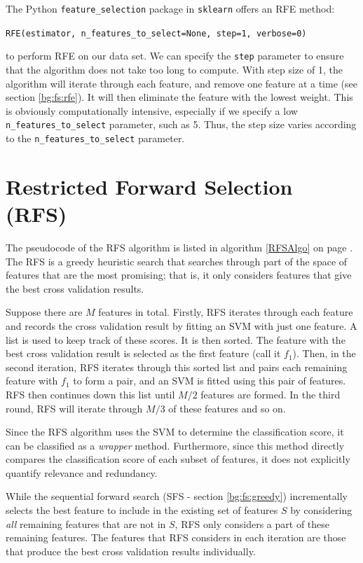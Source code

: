 \documentclass[12pt, twoside, a4paper]{report}
\begin{document}
The Python \texttt{feature\_selection} package in \texttt{sklearn} offers an RFE method:
\begin{center}
\texttt{RFE(estimator, n\_features\_to\_select=None, step=1, verbose=0)}
\end{center}

to perform RFE on our data set. We can specify the \texttt{step} parameter to ensure that the algorithm does not take too long to compute. With step size of 1, the algorithm will iterate through each feature, and remove one feature at a time (see section \ref{bg:fs:rfe}). It will then eliminate the feature with the lowest weight. This is obviously computationally intensive, especially if we specify a low \texttt{n\_features\_to\_select} parameter, such as 5. Thus, the step size varies according to the \texttt{n\_features\_to\_select} parameter.

\section{Restricted Forward Selection (RFS)} \label{body:rfs}

The pseudocode of the RFS algorithm \cite{deng1998omega} is listed in algorithm \ref{RFSAlgo} on page \pageref{RFSAlgo}. The RFS is a greedy heuristic search that searches through part of the space of features that are the most promising; that is, it only considers features that give the best cross validation results.

Suppose there are $M$ features in total. Firstly, RFS iterates through each feature and records the cross validation result by fitting an SVM with just one feature. A list is used to keep track of these scores. It is then sorted. The feature with the best cross validation result is selected as the first feature (call it $f_1$). Then, in the second iteration, RFS iterates through this sorted list and pairs each remaining feature with $f_1$ to form a pair, and an SVM is fitted using this pair of features. RFS then continues down this list until $M/2$ features are formed. In the third round, RFS will iterate through $M/3$ of these features and so on.

Since the RFS algorithm uses the SVM to determine the classification score, it can be classified as a \textit{wrapper} method. Furthermore, since this method directly compares the classification score of each subset of features, it does not explicitly quantify relevance and redundancy.

While the sequential forward search (SFS - section \ref{bg:fs:greedy}) incrementally selects the best feature to include in the existing set of features $S$ by considering \textit{all} remaining features that are not in $S$, RFS only considers a part of these remaining features. The features that RFS considers in each iteration are those that produce the best cross validation results individually.
\end{document}
